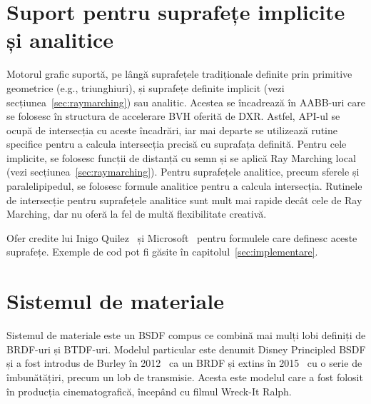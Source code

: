 \documentclass[12pt,a4paper]{report}
\numberwithin{equation}{section} %
\begin{document}
\section{Suport pentru suprafețe implicite și analitice}
Motorul grafic suportă, pe lângă suprafețele tradiționale definite prin primitive
geometrice (e.g., triunghiuri), și suprafețe definite implicit (vezi secțiunea~\ref{sec:raymarching}) sau analitic.
Acestea se încadrează în AABB-uri care se folosesc în structura de accelerare BVH
oferită de DXR. Astfel, API-ul se ocupă de intersecția cu aceste încadrări, iar
mai departe se utilizează rutine specifice pentru a calcula intersecția precisă
cu suprafața definită. Pentru cele implicite, se folosesc funcții de distanță cu semn
și se aplică Ray Marching local (vezi secțiunea~\ref{sec:raymarching}). Pentru
suprafețele analitice, precum sferele și paralelipipedul, se folosesc formule
analitice pentru a calcula intersecția. Rutinele de intersecție pentru suprafețele
analitice sunt mult mai rapide decât cele de Ray Marching, dar nu oferă la fel
de multă flexibilitate creativă.

Ofer credite lui Inigo Quilez~\cite{iq} și Microsoft~\cite{Schelet} pentru formulele care definesc aceste
suprafețe. Exemple de cod pot fi găsite în capitolul~\ref{sec:implementare}.

\section{Sistemul de materiale}\label{sec:disney}

Sistemul de materiale este un BSDF compus ce combină mai mulți lobi definiți
de BRDF-uri și BTDF-uri. Modelul particular este denumit Disney Principled BSDF
și a fost introdus de Burley în 2012~\cite{Disney} ca un BRDF și extins în 2015~\cite{DisneyBSDF}
cu o serie de îmbunătățiri, precum un lob de transmisie. Acesta este modelul care
a fost folosit în producția cinematografică, începând cu filmul Wreck-It Ralph.
\end{document}
